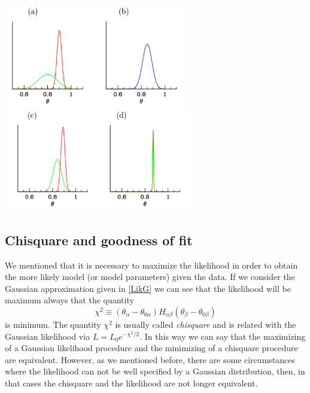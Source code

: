 \documentclass[onecolumn,           %
               showpacs,            %
               preprintnumbers,     %
               aps,                 %
               prl,          	    %
               letterpaper,             %
               superscriptaddress,      %
               nofootinbib,         %
               tightenlines,        %
               floats,floatfix      %
               ,usenatbib,
               ]{revtex4-1}
\begin{document}
\begin{minipage}{\textwidth}
\centering
\includegraphics[height=4.5cm]{Figures/g1.png}
\includegraphics[height=4.5cm]{Figures/g2.png}
\label{gausian1}
\end{minipage}
\subsection{Chisquare and goodness of fit}

We mentioned that it is necessary to maximize the likelihood in order to obtain the more likely model (or model parameters) given the data. If we consider the Gaussian approximation given in \eqref{LikG} we can see that the likelihood will be maximum always that the quantity
\begin{equation}\label{chi2}
\chi^2\equiv(\theta_\alpha-\theta_{0\alpha})H_{\alpha\beta}(\theta_\beta-\theta_{0\beta})
\end{equation}
is minimum. The quantity $\chi^2$ is usually called \textit{chisquare} and is related with the Gaussian likelihood via $L=L_0e^{-\chi^2/2}$. In this way we can say that the maximizing of a Gaussian likelihood procedure and the minimizing of a chisquare procedure are equivalent. However, as we mentioned before, there are some circumstances where the likelihood can not be well specified by a Gaussian distribution, then, in that cases the chisquare and the likelihood are not longer equivalent. 
\end{document}
